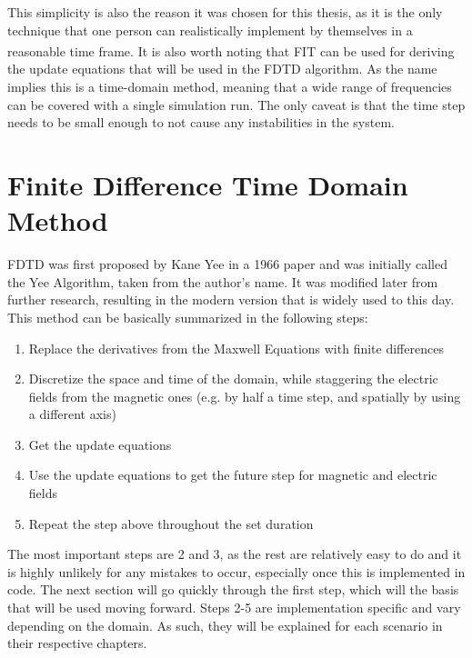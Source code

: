 This simplicity is also the reason it was chosen for this thesis, as it is the only technique that one person can realistically implement by themselves in a reasonable time frame.\textsuperscript{\cite{davidson2010computational}} It is also worth noting that FIT can be used for deriving the update equations that will be used in the FDTD algorithm. As the name implies this is a time-domain method, meaning that a wide range of frequencies can be covered with a single simulation run. The only caveat is that the time step needs to be small enough to not cause any instabilities in the system.


\section{Finite Difference Time Domain Method}

FDTD was first proposed by Kane Yee in a 1966 paper and was initially called the Yee Algorithm, taken from the author's name. It was modified later from further research, resulting in the modern version that is widely used to this day. This method can be basically summarized in the following steps:

\begin{enumerate}
	\item Replace the derivatives from the Maxwell Equations with finite differences
	\item Discretize the space and time of the domain, while staggering the electric fields from the magnetic ones (e.g. by half a time step, and spatially by using a different axis)
	\item Get the update equations
	\item Use the update equations to get the future step for magnetic and electric fields
	\item Repeat the step above throughout the set duration
\end{enumerate}

The most important steps are 2 and 3, as the rest are relatively easy to do and it is highly unlikely for any mistakes to occur, especially once this is implemented in code. The next section will go quickly through the first step, which will the basis that will be used moving forward. Steps 2-5 are implementation specific and vary depending on the domain. As such, they will be explained for each scenario in their respective chapters.

